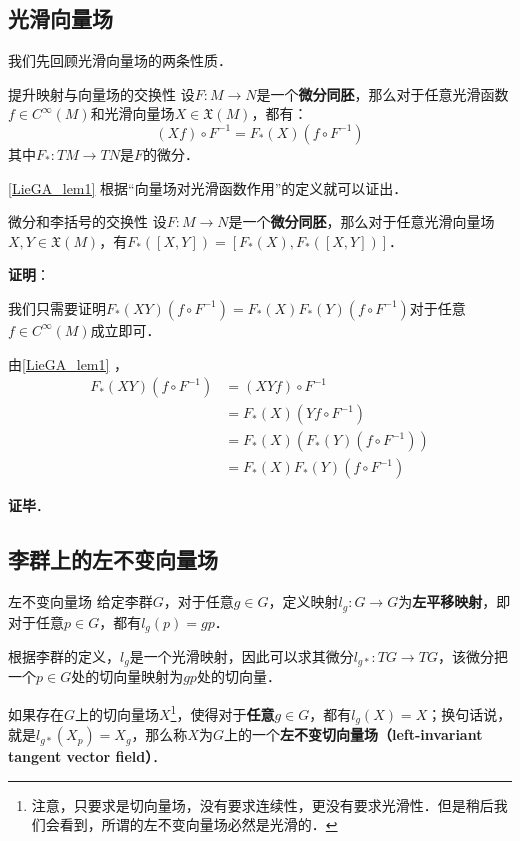 

\subsection{光滑向量场}

我们先回顾光滑向量场的两条性质．

\begin{lemma}{提升映射与向量场的交换性}\label{LieGA_lem1}
设$F:M\to N$是一个\textbf{微分同胚}，那么对于任意光滑函数$f\in C^{\infty}(M)$和光滑向量场$X\in\mathfrak{X}(M)$，都有：
\begin{equation}
(Xf)\circ F^{-1}=F_*(X)(f\circ F^{-1})
\end{equation}
其中$F_*:TM\to TN$是$F$的微分．
\end{lemma}

\autoref{LieGA_lem1} 根据“向量场对光滑函数作用”的定义就可以证出．

\begin{lemma}{微分和李括号的交换性}\label{LieGA_lem2}
设$F:M\to N$是一个\textbf{微分同胚}，那么对于任意光滑向量场$X, Y\in\mathfrak{X}(M)$，有$F_*([X, Y])=[F_*(X), F_*([X, Y])]$．
\end{lemma}

\textbf{证明}：

我们只需要证明$F_*(XY)(f\circ F^{-1})=F_*(X)F_*(Y)(f\circ F^{-1})$对于任意$f\in C^{\infty}(M)$成立即可．

由\autoref{LieGA_lem1} ，
\begin{equation}
\begin{aligned}
F_*(XY)(f\circ F^{-1})&=(XYf)\circ F^{-1}\\
&=F_*(X)(Yf\circ F^{-1})\\
&=F_*(X)(F_*(Y)(f\circ F^{-1}))\\
&=F_*(X)F_*(Y)(f\circ F^{-1})
\end{aligned}
\end{equation}

\textbf{证毕}．

\subsection{李群上的左不变向量场}

\begin{definition}{左不变向量场}\label{LieGA_def1}
给定李群$G$，对于任意$g\in G$，定义映射$l_g:G\to G$为\textbf{左平移映射}，即对于任意$p\in G$，都有$l_g(p)=gp$．

根据李群的定义，$l_g$是一个光滑映射，因此可以求其微分$l_{g*}:TG\to TG$，该微分把一个$p\in G$处的切向量映射为$gp$处的切向量．

如果存在$G$上的切向量场$X$\footnote{注意，只要求是切向量场，没有要求连续性，更没有要求光滑性．但是稍后我们会看到，所谓的左不变向量场必然是光滑的．}，使得对于\textbf{任意}$g\in G$，都有$l_g(X)=X$；换句话说，就是$l_{g*}(X_p)=X_g$，那么称$X$为$G$上的一个\textbf{左不变切向量场（left-invariant tangent vector field）}．
\end{definition}

